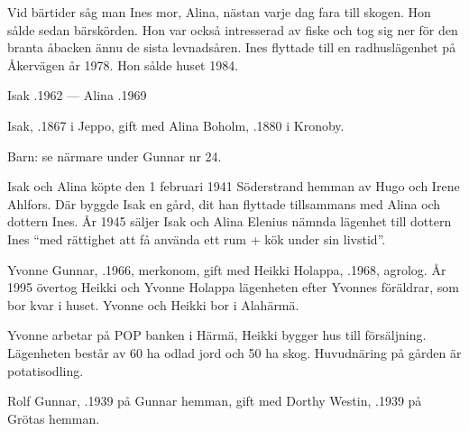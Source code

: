 Vid bärtider såg man Ines mor, Alina, nästan varje dag fara till skogen. Hon sålde sedan bärskörden. Hon var också intresserad av fiske och tog sig ner för den branta åbacken ännu de sista levnadsåren. Ines flyttade till en radhuslägenhet på Åkervägen år 1978. Hon sålde huset 1984.

Isak .1962  ---  Alina .1969


Isak, .1867 i Jeppo, gift med Alina Boholm, .1880 i Kronoby.

Barn: se närmare under Gunnar nr 24.

Isak och Alina köpte den 1 februari 1941 Söderstrand hemman av Hugo och Irene Ahlfors. Där byggde Isak en gård, dit han flyttade tillsammans med Alina och dottern Ines. År 1945 säljer Isak och Alina Elenius nämnda lägenhet till dottern Ines 	``med rättighet att få använda ett rum + kök under sin livstid''.






Yvonne Gunnar, .1966, merkonom, gift med Heikki Holappa, .1968, agrolog. År 1995 övertog Heikki och Yvonne Holappa lägenheten efter Yvonnes föräldrar, som bor kvar i huset. Yvonne och Heikki bor i Alahärmä.
\begin{jhchildren}
  \item {}
  \item {}
  \item {}
  \item {}
  \item {}
\end{jhchildren}

Yvonne arbetar på POP banken i Härmä, Heikki bygger hus till försäljning. Lägenheten består av 60 ha odlad jord och 50 ha skog. Huvudnäring på gården är potatisodling.


Rolf Gunnar, .1939 på Gunnar hemman, gift med Dorthy Westin, .1939 på Grötas hemman.
\begin{jhchildren}
  \item {}
  \item {}
\end{jhchildren}

